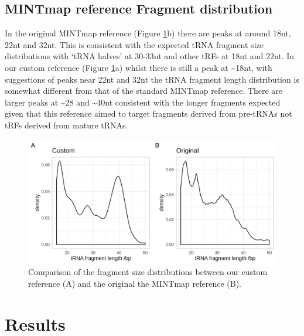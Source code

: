 \documentclass[
]{book}
\begin{document}
\hypertarget{mintmap-reference-fragment-distribution}{%
\subsection{MINTmap reference Fragment distribution}\label{mintmap-reference-fragment-distribution}}

In the original MINTmap reference (Figure \ref{fig:combinedFragSizeDists}b) there are peaks at around 18nt, 22nt and 32nt.
This is consistent with the expected tRNA fragment size distributions with `tRNA halves' at 30-33nt and other tRFs at 18nt and 22nt.
In our custom reference (Figure \ref{fig:combinedFragSizeDists}a) whilst there is still a peak at \textasciitilde18nt, with suggestions of peaks near 22nt and 32nt the tRNA fragment length distribution is somewhat different from that of the standard MINTmap reference.
There are larger peaks at \textasciitilde28 and \textasciitilde40nt consistent with the longer fragments expected given that this reference aimed to target fragments derived from pre-tRNAs not tRFs derived from mature tRNAs.

\begin{figure}

{\centering \includegraphics[width=1\linewidth]{./figs/combinedFragSizeDists} 

}

\caption{Comparison of the fragment size distributions between our custom reference (A) and the original the MINTmap reference (B).}\label{fig:combinedFragSizeDists}
\end{figure}



\newpage

\hypertarget{res}{%
\section{Results}\label{res}}
\end{document}
